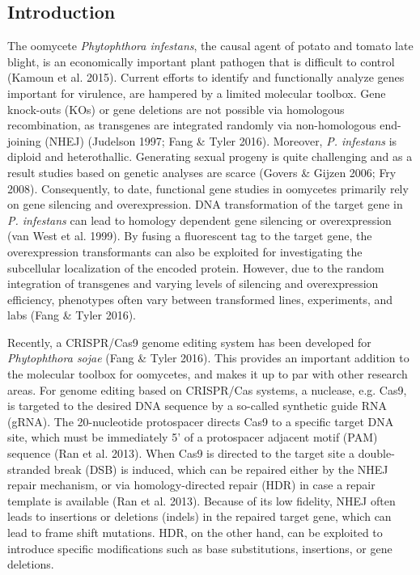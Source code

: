 \documentclass[onecolumn, 11pt,openany]{memoir}
\begin{document}
\begin{multicols}{2}
\section{Introduction}
The oomycete \textit{Phytophthora infestans}, the causal agent of potato and tomato late blight, is an economically important plant pathogen that is difficult to control (Kamoun et al. 2015). Current efforts to identify and functionally analyze genes important for virulence, are hampered by a limited molecular toolbox. Gene knock-outs (KOs) or gene deletions are not possible via homologous recombination, as transgenes are integrated randomly via non-homologous end-joining (NHEJ) (Judelson 1997; Fang \& Tyler 2016). Moreover, \textit{P. infestans }is diploid and heterothallic. Generating sexual progeny is quite challenging and as a result studies based on genetic analyses are scarce (Govers \& Gijzen 2006; Fry 2008). Consequently, to date, functional gene studies in oomycetes primarily rely on gene silencing and overexpression. DNA transformation of the target gene in \textit{P. infestans }can lead to homology dependent gene silencing or overexpression (van West et al. 1999). By fusing a fluorescent tag to the target gene, the overexpression transformants can also be exploited for investigating the subcellular localization of the encoded protein. However, due to the random integration of transgenes and varying levels of silencing and overexpression efficiency, phenotypes often vary between transformed lines, experiments, and labs (Fang \& Tyler 2016). 

Recently, a CRISPR/Cas9 genome editing system has been developed for \textit{Phytophthora sojae }(Fang \& Tyler 2016). This provides an important addition to the molecular toolbox for oomycetes, and makes it up to par with other research areas. For genome editing based on CRISPR/Cas systems, a nuclease, e.g. Cas9, is targeted to the desired DNA sequence by a so-called synthetic guide RNA (gRNA). The 20-nucleotide protospacer directs Cas9 to a specific target DNA site, which must be immediately 5' of a protospacer adjacent motif (PAM) sequence (Ran et al. 2013). When Cas9 is directed to the target site a double-stranded break (DSB) is induced, which can be repaired either by the NHEJ repair mechanism, or via homology-directed repair (HDR) in case a repair template is available (Ran et al. 2013). Because of its low fidelity, NHEJ often leads to insertions or deletions (indels) in the repaired target gene, which can lead to frame shift mutations. HDR, on the other hand, can be exploited to introduce specific modifications such as base substitutions, insertions, or gene deletions. 


\end{multicols}
\end{document}

